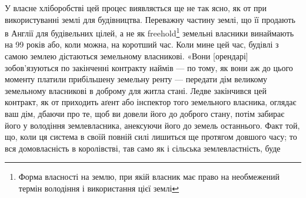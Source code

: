 \disablefootnotebreak{}
У власне хліборобстві цей процес виявляється ще не так ясно, як
от при використуванні землі для будівництва. Переважну частину землі, що її
продають в Англії для будівельних цілей, а не як freehold\footnote*{
Форма власності на землю, при якій власник має право на необмежений термін володіння і використання цієї землі 
} земельні власники
винаймають на 99 років або, коли можна, на коротший час. Коли мине цей
час, будівлі з самою землею дістаються земельному власникові. «Вони [орендарі]
зобов’язуються по закінченні контракту наймів — по тому, як вони аж до цього
моменту платили прибільшену земельну ренту — передати дім великому земельному
власникові в доброму для житла стані. Ледве закінчився цей контракт,
як от приходить аґент або інспектор того земельного власника, оглядає ваш
дім, дбаючи про те, щоб ви довели його до доброго стану, потім забирає його
у володіння землевласника, анексуючи його до земель останнього. Факт той, що,
коли ця система в своїй повній силі лишиться ще протягом довшого часу; то
вся домовласність в королівстві, тав само як і сільська землевластність, буде
\parbreak{}  %
